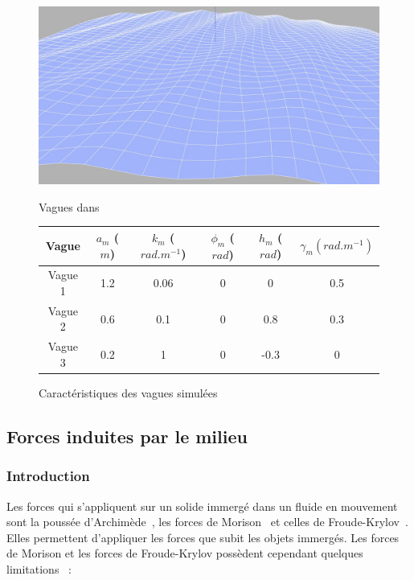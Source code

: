				\begin{figure}[!htb]
					\begin{minipage}[c]{0.45\textwidth}
						\centering
						\includegraphics[width=\textwidth]{imgs/gerstner.jpg}
						\caption{Vagues dans \gazebo{}}
						\label{fig:Gerstner}
					\end{minipage} \hfill
					\begin{minipage}[c]{0.54\textwidth}
						\begin{adjustbox}{max width=\textwidth}
							\begin{tabular}{c c c c c c}
								\toprule
								\textbf{Vague} & $a_m$ ($m$) & $k_m$ ($rad.m^{-1}$) & $\phi_m$ ($rad$) & $h_m$ ($rad$) & $\gamma_m (rad.m^{-1})$ \\
								\midrule
								Vague 1 & 1.2 & 0.06 & 0 & 0 & 0.5\\
								Vague 2 & 0.6 & 0.1 & 0 & 0.8 & 0.3\\
								Vague 3 & 0.2 & 1 & 0 & -0.3 & 0\\
								\bottomrule
							\end{tabular}
						\end{adjustbox}
						\caption{Caractéristiques des vagues simulées}
						\label{table:wave}
					\end{minipage}
				\end{figure}

		\subsection{Forces induites par le milieu}

			\subsubsection{Introduction}
			
				Les forces qui s'appliquent sur un solide immergé dans un fluide en mouvement sont la poussée d'Archimède~\cite{dean1991water}, les forces de Morison~\cite{morison1950force, dean1991water} et celles de Froude-Krylov~\cite{dean1991water}. Elles permettent d'appliquer les forces que subit les objets immergés. Les forces de Morison et les forces de Froude-Krylov possèdent cependant quelques limitations~\cite{dean1991water, sarpkaya2010wave} :


